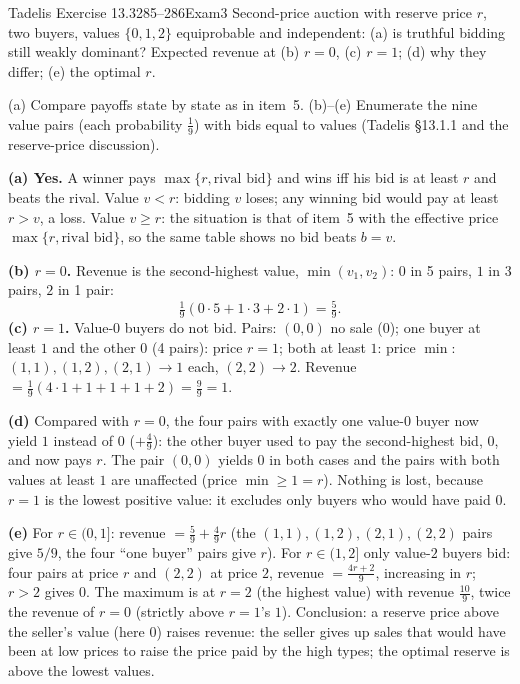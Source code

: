 \begin{exsol}{Tadelis Exercise 13.3}{285--286}{Exam}{3}
\asked Second-price auction with reserve price $r$, two buyers, values $\{0,1,2\}$ equiprobable and
independent: (a) is truthful bidding still weakly dominant? Expected revenue at (b) $r=0$, (c) $r=1$;
(d) why they differ; (e) the optimal $r$.

\method (a) Compare payoffs state by state as in item~5. (b)--(e) Enumerate the nine value pairs
(each probability $\tfrac19$) with bids equal to values (Tadelis \S13.1.1 and the reserve-price
discussion).

\solution
\textbf{(a) Yes.} A winner pays $\max\{r,\text{rival bid}\}$ and wins iff his bid is at least $r$ and
beats the rival. Value $v<r$: bidding $v$ loses; any winning bid would pay at least $r>v$, a loss.
Value $v\ge r$: the situation is that of item~5 with the effective price
$\max\{r,\text{rival bid}\}$, so the same table shows no bid beats $b=v$.

\textbf{(b) $r=0$.} Revenue is the second-highest value, $\min(v_1,v_2)$: $0$ in 5 pairs, $1$ in
3 pairs, $2$ in 1 pair:
\[
  \tfrac19(0\cdot5+1\cdot3+2\cdot1)=\tfrac59 .
\]
\textbf{(c) $r=1$.} Value-0 buyers do not bid. Pairs: $(0,0)$ no sale ($0$); one buyer at least $1$ and the
other $0$ (4 pairs): price $r=1$; both at least $1$: price $\min$: $(1,1),(1,2),(2,1)\to1$ each,
$(2,2)\to2$. Revenue $=\tfrac19(4\cdot1+1+1+1+2)=\tfrac99=1$.

\textbf{(d)} Compared with $r=0$, the four pairs with exactly one value-$0$ buyer now yield $1$
instead of $0$ ($+\tfrac49$): the other buyer used to pay the second-highest bid, $0$, and now
pays $r$. The pair $(0,0)$ yields $0$ in both cases and the pairs with both values at least $1$
are unaffected (price $\min\ge1=r$). Nothing is lost, because $r=1$ is the lowest positive value:
it excludes only buyers who would have paid $0$.

\textbf{(e)} For $r\in(0,1]$: revenue $=\tfrac59+\tfrac49r$ (the $(1,1),(1,2),(2,1),(2,2)$ pairs give
$5/9$, the four ``one buyer'' pairs give $r$). For $r\in(1,2]$ only value-$2$ buyers bid:
four pairs at price $r$ and $(2,2)$ at price $2$, revenue $=\tfrac{4r+2}{9}$, increasing in $r$;
$r>2$ gives $0$. The maximum is at $r=2$ (the highest value) with revenue $\tfrac{10}{9}$, twice the
revenue of $r=0$ (strictly above $r=1$'s $1$). Conclusion: a reserve price above the seller's
value (here $0$) raises revenue: the seller gives up sales that would have been at low prices
to raise the price paid by the high types; the optimal reserve is above the lowest values.


\end{exsol}

